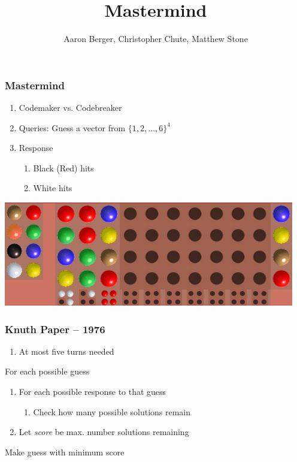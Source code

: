 \documentclass{beamer}
\title{Mastermind}
\author{Aaron Berger, Christopher Chute, Matthew Stone}
\begin{document}
    \begin{frame}
    	\maketitle
    \end{frame}

    \begin{frame}
    	\frametitle{Mastermind}
	   	\begin{enumerate}[label=\roman*.]
	    \item Codemaker vs. Codebreaker
	    \item Queries: Guess a vector from $\{1,2,\ldots,6\}^4$
	    \item Response
	    	\begin{enumerate}[label=\roman*.]
			\item Black (Red) hits
			\item White hits
			\end{enumerate}
   	    \end{enumerate}
	    \begin{center}
	    \includegraphics[width=.65\textwidth, keepaspectratio=true]{mm.png}
	    \end{center}
    \end{frame}

    \begin{frame}
    	\frametitle{Knuth Paper -- 1976}
    	\begin{enumerate}[label=\roman*.]
		\item At most five turns needed
		\end{enumerate}
		For each possible guess
			\begin{enumerate}[label=]
			\item For each possible response to that guess
				\begin{enumerate}[label=]
				\item Check how many possible solutions remain
				\end{enumerate}
			\item Let \textit{score} be max. number solutions remaining
			\end{enumerate}
		Make guess with minimum score
    \end{frame}
 
\end{document}
